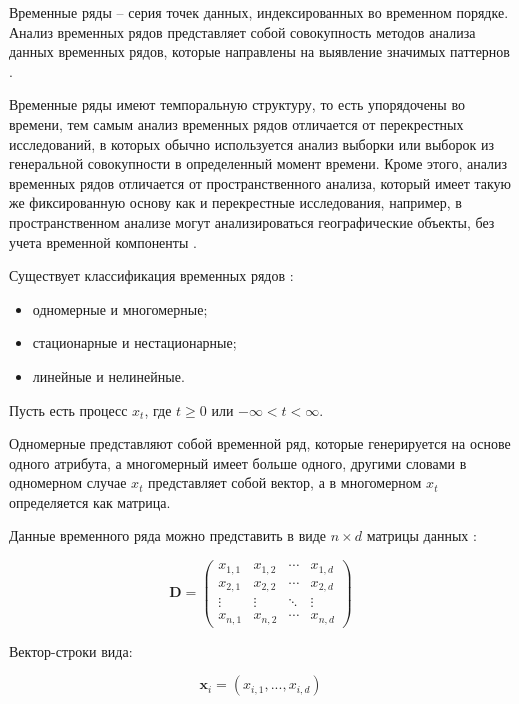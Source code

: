 Временные ряды -- серия точек данных, индексированных во временном порядке.
Анализ временных рядов представляет собой совокупность методов анализа данных временных рядов,
которые направлены на выявление значимых паттернов \cite{box-series} .

Временные ряды имеют темпоральную структуру, то есть упорядочены во времени,
тем самым анализ временных рядов отличается от перекрестных исследований,
в которых обычно используется анализ выборки или выборок из генеральной совокупности в определенный момент времени.
Кроме этого, анализ временных рядов отличается от пространственного анализа,
который имеет такую же фиксированную основу как и перекрестные исследования,
например, в пространственном анализе могут анализироваться географические объекты, без учета временной компоненты \cite{shumway-series} .

Существует классификация временных рядов  \cite{zhang-series} :

\begin{itemize}
    \item одномерные и многомерные;
    \item стационарные и нестационарные;
    \item линейные и нелинейные.
\end{itemize}

Пусть есть процесс $x_t$, где $t \geq 0$ или $-\infty < t < \infty $.

Одномерные представляют собой временной ряд, которые генерируется на основе одного атрибута,
а многомерный имеет больше одного, другими словами в одномерном случае $x_t$ представляет собой вектор,
а в многомерном $x_t$ определяется как матрица.

Данные временного ряда можно представить в виде $n\times d$ матрицы данных \cite{zaki}: 

\begin{equation} \label{data_matrix}
    \textbf{D} = 
    \begin{pmatrix}
    x_{1,1} & x_{1,2} & \cdots & x_{1,d} \\
    x_{2,1} & x_{2,2} & \cdots & x_{2,d} \\
    \vdots  & \vdots  & \ddots & \vdots  \\
    x_{n,1} & x_{n,2} & \cdots & x_{n,d} 
    \end{pmatrix}
\end{equation}

Вектор-строки вида:

\begin{equation}
    \textbf{x}_i = (x_{i,1}, ..., x_{i,d})
\end{equation}

